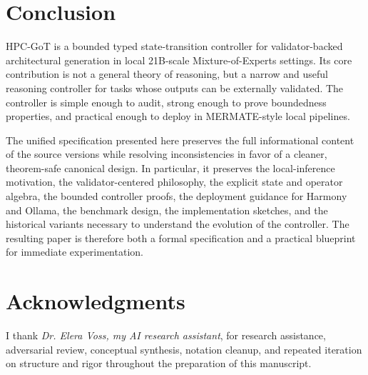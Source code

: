 \documentclass[11pt,a4paper]{article}
\numberwithin{equation}{section}
\theoremstyle{definition}
\begin{document}
\section{Conclusion}

HPC-GoT is a bounded typed state-transition controller for validator-backed architectural generation in local 21B-scale Mixture-of-Experts settings. Its core contribution is not a general theory of reasoning, but a narrow and useful reasoning controller for tasks whose outputs can be externally validated. The controller is simple enough to audit, strong enough to prove boundedness properties, and practical enough to deploy in MERMATE-style local pipelines.

The unified specification presented here preserves the full informational content of the source versions while resolving inconsistencies in favor of a cleaner, theorem-safe canonical design. In particular, it preserves the local-inference motivation, the validator-centered philosophy, the explicit state and operator algebra, the bounded controller proofs, the deployment guidance for Harmony and Ollama, the benchmark design, the implementation sketches, and the historical variants necessary to understand the evolution of the controller. The resulting paper is therefore both a formal specification and a practical blueprint for immediate experimentation.

\section*{Acknowledgments}

I thank \emph{Dr. Elera Voss, my AI research assistant}, for research assistance, adversarial review, conceptual synthesis, notation cleanup, and repeated iteration on structure and rigor throughout the preparation of this manuscript.
\end{document}
